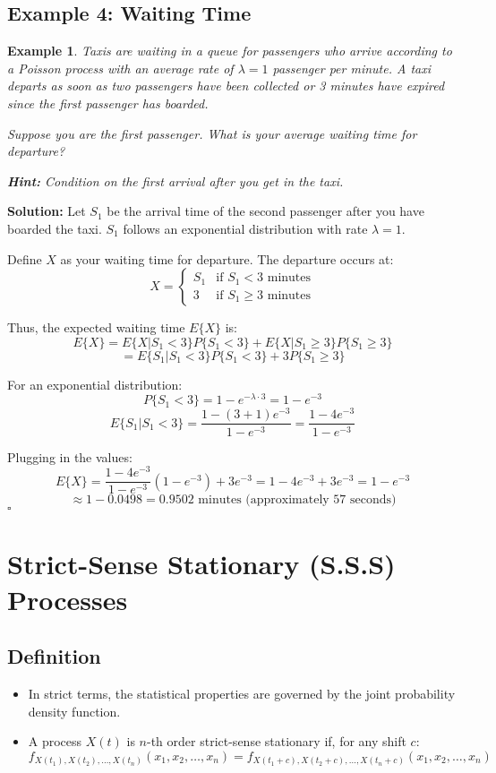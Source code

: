 \documentclass[12pt]{article}
\newtheorem{example}{Example}
\newenvironment{solution}{\noindent\textbf{Solution:}}{\hfill$\square$}
\begin{document}
\subsection{Example 4: Waiting Time}
\begin{example}
Taxis are waiting in a queue for passengers who arrive according to a Poisson process with an average rate of \( \lambda = 1 \) passenger per minute. A taxi departs as soon as two passengers have been collected or 3 minutes have expired since the first passenger has boarded.

Suppose you are the first passenger. What is your average waiting time for departure?

\textbf{Hint:} Condition on the first arrival after you get in the taxi.
\end{example}
\begin{solution}
Let \( S_1 \) be the arrival time of the second passenger after you have boarded the taxi. \( S_1 \) follows an exponential distribution with rate \( \lambda = 1 \).

Define \( X \) as your waiting time for departure. The departure occurs at:
\[
X = 
\begin{cases} 
S_1 & \text{if } S_1 < 3 \text{ minutes} \\
3 & \text{if } S_1 \geq 3 \text{ minutes}
\end{cases}
\]

Thus, the expected waiting time \( E\{X\} \) is:
\[
E\{X\} = E\{X | S_1 < 3\} P\{S_1 < 3\} + E\{X | S_1 \geq 3\} P\{S_1 \geq 3\}
\]
\[
= E\{S_1 | S_1 < 3\} P\{S_1 < 3\} + 3 P\{S_1 \geq 3\}
\]

For an exponential distribution:
\[
P\{S_1 < 3\} = 1 - e^{-\lambda \cdot 3} = 1 - e^{-3}
\]
\[
E\{S_1 | S_1 < 3\} = \frac{1 - (3 + 1)e^{-3}}{1 - e^{-3}} = \frac{1 - 4e^{-3}}{1 - e^{-3}}
\]

Plugging in the values:
\[
E\{X\} = \frac{1 - 4e^{-3}}{1 - e^{-3}} (1 - e^{-3}) + 3 e^{-3} = 1 - 4e^{-3} + 3e^{-3} = 1 - e^{-3}
\]
\[
\approx 1 - 0.0498 = 0.9502 \text{ minutes (approximately 57 seconds)}
\]
\end{solution}

\section{Strict-Sense Stationary (S.S.S) Processes}
\subsection{Definition}
\begin{itemize}
    \item In strict terms, the statistical properties are governed by the joint probability density function.
    \item A process \( X(t) \) is \( n \)-th order strict-sense stationary if, for any shift \( c \):
    \[
    f_{X(t_1), X(t_2), \ldots, X(t_n)}(x_1, x_2, \ldots, x_n) = f_{X(t_1 + c), X(t_2 + c), \ldots, X(t_n + c)}(x_1, x_2, \ldots, x_n)
    \]
\end{itemize}
\end{document}
